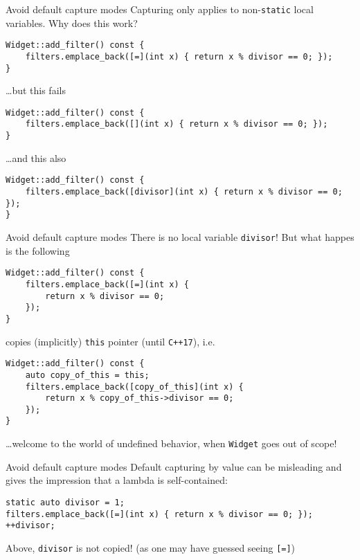 \begin{frame}[fragile]{Avoid default capture modes}
    Capturing only applies to non-\texttt{static} local variables. Why does this work?
    \begin{lstlisting}
Widget::add_filter() const {
    filters.emplace_back([=](int x) { return x % divisor == 0; });
}
    \end{lstlisting}
    \ldots but this fails
    \begin{lstlisting}
Widget::add_filter() const {
    filters.emplace_back([](int x) { return x % divisor == 0; });
}
    \end{lstlisting}

    \ldots and this also
    \begin{lstlisting}
Widget::add_filter() const {
    filters.emplace_back([divisor](int x) { return x % divisor == 0; });
}
    \end{lstlisting}
\end{frame}

\begin{frame}[fragile]{Avoid default capture modes}
    There is no local variable \texttt{divisor}! But what happes is the following
    \begin{lstlisting}
Widget::add_filter() const {
    filters.emplace_back([=](int x) {
        return x % divisor == 0;
    });
}
    \end{lstlisting}
    copies (implicitly) \texttt{this} pointer (\textcolor{vertexDarkRed}{until \texttt{C++17}}), i.e.
    \begin{lstlisting}    
Widget::add_filter() const {
    auto copy_of_this = this;
    filters.emplace_back([copy_of_this](int x) {
        return x % copy_of_this->divisor == 0;
    });
}
    \end{lstlisting}

    \ldots welcome to the world of undefined behavior, when \texttt{Widget} goes out of scope!
\end{frame}

\begin{frame}[fragile]{Avoid default capture modes}
    Default capturing by value can be misleading and gives the impression that a lambda is self-contained:
    \begin{lstlisting}
static auto divisor = 1;
filters.emplace_back([=](int x) { return x % divisor == 0; });
++divisor;
    \end{lstlisting}
    Above, \texttt{divisor} is not copied! (as one may have guessed seeing \texttt{[=]})
\end{frame}

